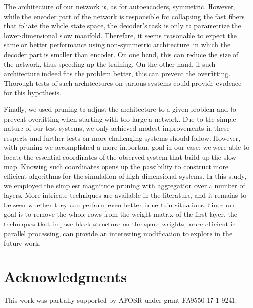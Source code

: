 \documentclass{article}
\begin{document}
The architecture of our network is, as for autoencoders, symmetric. However, while the encoder part of the network is responsible for collapsing the fast fibers that foliate the whole state space, the decoder's task is only to parametrize the lower-dimensional slow manifold. Therefore, it seems reasonable to expect the same or better performance using non-symmetric architecture, in which the decoder part is smaller than encoder. On one hand, this can reduce the size of the network, thus speeding up the training. On the other hand, if such architecture indeed fits the problem better, this can prevent the overfitting. Thorough tests of such architectures on various systems could provide evidence for this hypothesis.

Finally, we used pruning to adjust the architecture to a given problem and to prevent overfitting when starting with too large a network. Due to the simple nature of our test systems, we only achieved modest improvements in these respects and further tests on more challenging systems should follow. However, with pruning we accomplished a more important goal in our case: we were able to locate the essential coordinates of the observed system that build up the slow map. Knowing such coordinates opens up the possibility to construct more efficient algorithms for the simulation of high-dimensional systems. In this study, we employed the simplest magnitude pruning with aggregation over a number of layers. More intricate techniques are available in the literature, and it remains to be seen whether they can perform even better in certain situations. Since our goal is to remove the whole rows from the weight matrix of the first layer, the techniques that impose block structure on the spare weights, more efficient in parallel processing, can provide an interesting modification to explore in the future work.

\section*{Acknowledgments}
This work was partially supported by AFOSR under grant FA9550-17-1-9241.

\printbibliography
\end{document}
